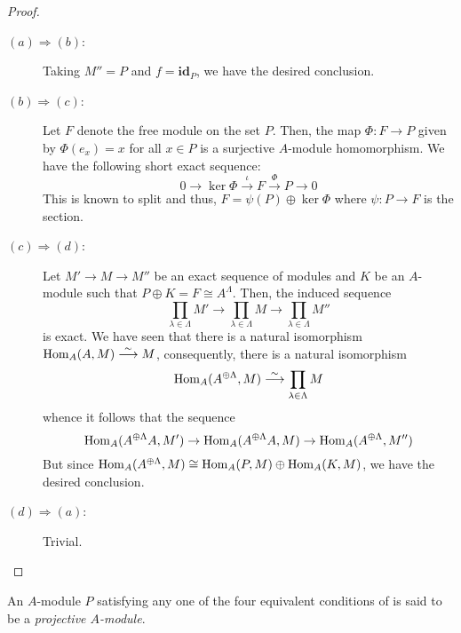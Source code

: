 \begin{proof}
\hfill
\begin{description}
\item[$(a)\Longrightarrow(b)$:] Taking $M'' = P$ and $f = \mathbf{id}_P$, we have the desired conclusion. 
\item[$(b)\Longrightarrow(c)$:] Let $F$ denote the free module on the set $P$. Then, the map $\Phi: F\to P$ given by $\Phi(e_x) = x$ for all $x\in P$ is a surjective $A$-module homomorphism. We have the following short exact sequence: 
\begin{equation*}
    0\rightarrow\ker\Phi\stackrel{\iota}{\longrightarrow}F\stackrel{\Phi}{\longrightarrow}P\rightarrow 0
\end{equation*}
This is known to split and thus, $F = \psi(P)\oplus\ker\Phi$ where $\psi: P\to F$ is the section.

\item[$(c)\Longrightarrow(d)$:] Let $M'\rightarrow M\rightarrow M''$ be an exact sequence of modules and $K$ be an $A$-module such that $P\oplus K = F\cong A^\Lambda$. Then, the induced sequence 
\begin{equation*}
    \prod_{\lambda\in\Lambda}M'\rightarrow\prod_{\lambda\in\Lambda}M\rightarrow\prod_{\lambda\in\Lambda}M''
\end{equation*}
is exact. We have seen that there is a natural isomorphism $\operatorname{Hom}_A(A,M)\stackrel{\sim}{\longrightarrow}M$, consequently, there is a natural isomorphism 
\begin{equation*}
    \operatorname{Hom}_A(A^{\oplus\Lambda}, M)\stackrel{\sim}{\longrightarrow}\prod_{\lambda\in\Lambda}M
\end{equation*}
whence it follows that the sequence 
\begin{equation*}
    \operatorname{Hom}_A(A^{\oplus\Lambda}A,M')\rightarrow\operatorname{Hom}_A(A^{\oplus\Lambda}A,M)\rightarrow\operatorname{Hom}_A(A^{\oplus\Lambda},M'')
\end{equation*}
But since $\operatorname{Hom}_A(A^{\oplus\Lambda},M)\cong\operatorname{Hom}_A(P,M)\oplus\operatorname{Hom}_A(K,M)$, we have the desired conclusion.

\item[$(d)\Longrightarrow(a)$:] Trivial.
\end{description}
\end{proof}

\begin{definition}
    An $A$-module $P$ satisfying any one of the four equivalent conditions of  is said to be a \textit{projective $A$-module}.
\end{definition}

